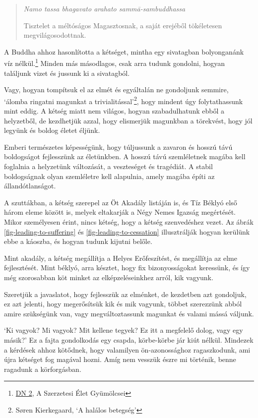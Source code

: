 \begin{quote}
\emph{Namo tassa bhagavato arahato sammā-sambuddhassa}

Tisztelet a méltóságos Magasztosnak, a saját erejéből tökéletesen
megvilágosodottnak.
\end{quote}


A Buddha ahhoz hasonlította a kétséget, mintha egy sivatagban
bolyonganánk víz nélkül.\footnote{\href{https://suttacentral.net/dn2}{DN
  2}, A Szerzetesi Élet Gyümölcsei} Minden más másodlagos, csak arra
tudunk gondolni, hogyan találjunk vizet és jussunk ki a sivatagból.

Vagy, hogyan tompítsuk el az elmét és egyáltalán ne gondoljunk semmire,
`álomba ringatni magunkat a trivialitással'\footnote{Søren Kierkegaard,
  `A halálos betegség'}, hogy mindent úgy folytathassunk mint eddig. A
kétség miatt nem világos, hogyan szabadulhatunk ebből a helyzetből, de
kezdhetjük azzal, hogy elismerjük magunkban a törekvést, hogy jól
legyünk és boldog életet éljünk.

Emberi természetes képességünk, hogy túljussunk a zavaron és hosszú távú
boldogságot fejlesszünk az életünkben. A hosszú távú szemléletnek magába
kell foglalnia a helyzetünk változását, a veszteséget és tragédiát. A
stabil boldogságnak olyan szemléletre kell alapulnia, amely magába építi
az állandótlanságot.

A szuttákban, a kétség szerepel az Öt Akadály listáján is, és Tíz Béklyó
első három eleme között is, melyek eltakarják a Négy Nemes Igazság
megértését. Mikor személyesen érint, nincs kétség, hogy a kétség
szenvedéshez vezet. Az ábrák \ref{fig-leading-to-suffering} és
\ref{fig-leading-to-cessation} illusztrálják hogyan kerülünk ebbe a
káoszba, és hogyan tudunk kijutni belőle.

Mint akadály, a kétség megállítja a Helyes Erőfeszítést, és megállítja
az elme fejlesztését. Mint béklyó, arra késztet, hogy fix
bizonyosságokat keressünk, és így még szorosabban köt minket az
elképzeléseinkhez arról, kik vagyunk.

Szeretjük a javaslatot, hogy fejlesszük az elménket, de kezdetben azt
gondoljuk, ez azt jelenti, hogy megerősítsük kik és mik vagyunk, többet
szerezzünk abból amire szükségünk van, vagy megváltoztassunk magunkat és
valami mássá váljunk.

`Ki vagyok? Mi vagyok? Mit kellene tegyek? Ez itt a megfelelő dolog,
vagy egy másik?' Ez a fajta gondolkodás egy csapda, körbe-körbe jár kiút
nélkül. Mindezek a kérdések ahhoz kötődnek, hogy valamilyen
ön-azonossághoz ragaszkodunk, ami újra kétséget fog magával hozni. Amíg
nem vesszük észre mi történik, benne ragadunk a körforgásban.

